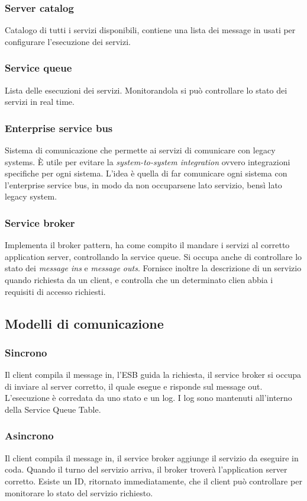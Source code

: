 \subsubsection{Server catalog}
Catalogo di tutti i servizi disponibili, contiene una lista dei message in usati 
per configurare l'esecuzione dei servizi.

\subsubsection{Service queue}
Lista delle esecuzioni dei servizi. Monitorandola si può controllare lo stato dei 
servizi in real time.

\subsubsection{Enterprise service bus}
Sistema di comunicazione che permette ai servizi di comunicare con legacy systems.
È utile per evitare la \emph{system-to-system integration} ovvero integrazioni specifiche
per ogni sistema. L'idea è quella di far comunicare ogni sistema con l'enterprise 
service bus, in modo da non occuparsene lato servizio, bensì lato legacy system.

\subsubsection{Service broker}
Implementa il broker pattern, ha come compito il mandare 
i servizi al corretto application server, controllando la service queue.
Si occupa anche di controllare lo stato dei \emph{message ins} e \emph{message outs}.
Fornisce inoltre la descrizione di un servizio quando richiesta da un client, 
e controlla che un determinato clien abbia i requisiti di accesso richiesti.

\subsection{Modelli di comunicazione}
\subsubsection{Sincrono}
Il client compila il message in, l'ESB guida la richiesta, il service broker si occupa di 
inviare al server corretto, il quale esegue e risponde sul message out. L'esecuzione
è corredata da uno stato e un log. I log sono mantenuti all'interno della Service Queue Table.

\subsubsection{Asincrono}
Il client compila il message in, il service broker aggiunge il servizio da eseguire in 
coda. Quando il turno del servizio arriva, il broker troverà l'application server corretto.
Esiste un ID, ritornato immediatamente, che il client può controllare per monitorare lo stato del servizio 
richiesto.

